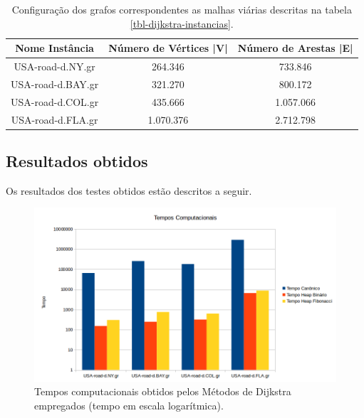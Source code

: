 \begin{table}[H]
\caption{Configuração dos grafos correspondentes as malhas viárias descritas na tabela \ref{tbl-dijkstra-instancias}.}
\label{tbl-dijkstra-configuracao}
\centering
\begin{adjustbox}{max width=\textwidth}
\begin{tabular}{|c|c|c|}
\hline 
\textbf{Nome Instância} & \textbf{Número de Vértices |V|} & \textbf{Número de Arestas |E|} \\ 
\hline 
USA-road-d.NY.gr
 & 264.346
 & 733.846
 \\ 
\hline 
USA-road-d.BAY.gr
 & 321.270
 & 800.172
 \\ 
\hline 
USA-road-d.COL.gr
 & 435.666
 & 1.057.066
 \\ 
\hline 
USA-road-d.FLA.gr
 & 1.070.376
 & 2.712.798
 \\ 
\hline 
\end{tabular}
\end{adjustbox} 
\end{table}

\subsection{Resultados obtidos}
\label{sec-dijkstra-experimentos-resultados}
Os resultados dos testes obtidos estão descritos a seguir.

\begin{figure}[H]
\centering
\includegraphics[width=.90\textwidth]{figuras/dijkstra-tempos} 
\caption{Tempos computacionais obtidos pelos Métodos de Dijkstra empregados (tempo em escala logarítmica).}
\label{fig-dijkstra-resultados-tempos}
\end{figure}


